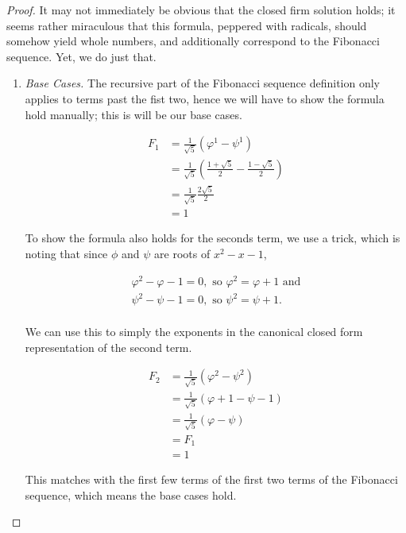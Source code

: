 \begin{proof}
	It may not immediately be obvious that the closed firm solution holds; it seems rather miraculous that this formula, peppered with radicals, should somehow yield whole numbers, and additionally correspond to the Fibonacci sequence. Yet, we do just that.
	
	\vspace{\baselineskip}
	\begin{enumerate}
		\item \emph{Base Cases.}
		The recursive part of the Fibonacci sequence definition only applies to terms past the fist two, hence we will have to show the formula hold manually; this is will be our base cases.
		
		\begin{align*}
			F_1 &= \frac{1}{\sqrt{5}}\left( \varphi^1 - \psi^1 \right) \\
			&= \frac{1}{\sqrt{5}}\left( \frac{1 + \sqrt{5}}{2} - \frac{1 - \sqrt{5}}{2} \right) \\
			&= \frac{1}{\sqrt{5}} \frac{2\sqrt{5}}{2} \\
			&= 1
		\end{align*}
		
		To show the formula also holds for the seconds term, we use a trick, which is noting that since $\phi$ and $\psi$ are roots of $x^2 - x - 1$,
		
		\begin{align*}
			\varphi^2 - \varphi - 1 = 0, \text{ so } \varphi^2 = \varphi + 1 \text{ and} \\
			\psi^2 - \psi - 1 = 0, \text{ so } \psi^2 = \psi + 1. \\
		\end{align*}
		
		We can use this to simply the exponents in the canonical closed form representation of the second term.
		
		\begin{align*}
			F_2 &= \frac{1}{\sqrt{5}}\left( \varphi^2 - \psi^2 \right) \\
			&= \frac{1}{\sqrt{5}}\left( \varphi + 1 - \psi - 1 \right) \\
			&= \frac{1}{\sqrt{5}}\left( \varphi - \psi \right) \\
			&= F_1 \\
			&= 1
		\end{align*}
		
		This matches with the first few terms of the first two terms of the Fibonacci sequence, which means the base cases hold.
		

\end{enumerate}
\end{proof}
